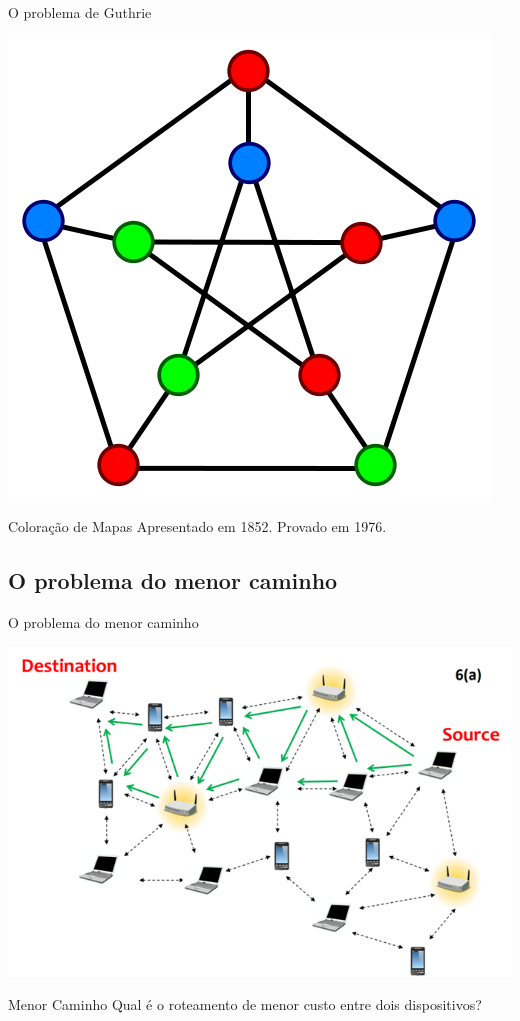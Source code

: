 \documentclass[xcolor=dvipsnames,table]{beamer}
\begin{document}
	\begin{frame}{O problema de Guthrie}
		\begin{center}
    		\includegraphics[height=.6\textheight]{images/grafoColorido2.png}
  		\end{center}
		\begin{block}{Coloração de Mapas} \pause
			Apresentado em 1852. Provado em 1976.
		\end{block}
	\end{frame}
	
	\subsection{O problema do menor caminho}
	\begin{frame}{O problema do menor caminho}
		\begin{center}
    		\includegraphics[height=.6\textheight]{images/redes.png}
  		\end{center}
		\begin{alertblock}{Menor Caminho} \pause
			Qual é o roteamento de menor custo entre dois dispositivos?
		\end{alertblock}
	\end{frame}
	
\end{document}
